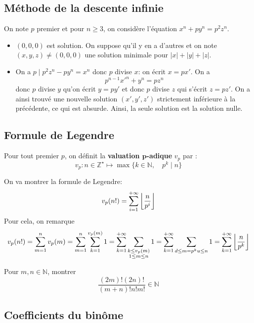 \subsection{Méthode de la descente infinie}

On note $p$ premier et pour $n\geq 3$, on considère l'équation $x^n+py^n=p^2z^n$.
\begin{itemize}
    \item $(0, 0, 0)$ est solution. On suppose qu'il y en a d'autres et on note $(x, y, z)\neq (0, 0, 0)$ une solution minimale pour $|x|+|y|+|z|$.
    \item On a $p\;|\;p^2z^n-py^n=x^n$ donc $p$ divise $x$: on écrit $x=px'$. On a \[
            p^{n-1}x'^n+y^n=pz^n
        \]
        donc $p$ divise $y$ qu'on écrit $y=py'$ et donc $p$ divise $z$ qui s'écrit $z=pz'$. On a ainsi trouvé une nouvelle solution $(x', y', z')$ strictement inférieure à la précédente, ce qui est absurde. Ainsi, la seule solution est la solution nulle.
\end{itemize}

\subsection{Formule de Legendre}

\begin{dfn}
     Pour tout premier $p$, on définit la \textbf{valuation $\bm p$-adique} $v_p$ par : \[
        v_p: n\in\mathbb Z^\star \longmapsto \max\{k\in\mathbb N, \quad p^k\;|\; n\}
    \]
\end{dfn}

On va montrer la formule de Legendre: \[
    v_p(n!)=\sum_{i=1}^{+\infty}\left\lfloor\frac n{p^i}\right\rfloor
\]
Pour cela, on remarque \[
    v_p(n!)=\sum_{m=1}^nv_p(m)=\sum_{m=1}^n\sum_{k=1}^{v_p(m)}1=\sum_{k=1}^{+\infty}\sum_{\substack{k\leq v_p(m)\\ 1\leq m\leq n}}1=\sum_{k=1}^{+\infty}\sum_{d\leq m=p^ku\leq n}1=\sum_{k=1}^{+\infty}\left\lfloor\frac n{p^k}\right\rfloor
\]

\begin{exo}[X]
     Pour $m, n\in\mathbb N$, montrer \[
        \frac{(2m)!(2n)!}{(m+n)!n!m!}\in\mathbb N
     \]
\end{exo}

\subsection{Coefficients du binôme}

